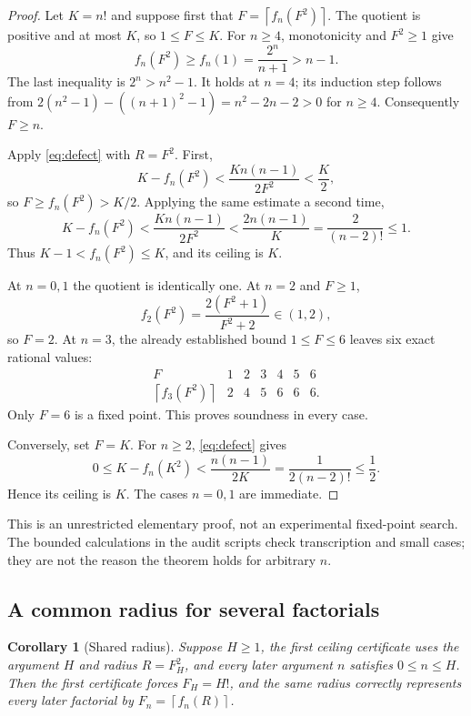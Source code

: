 \documentclass[11pt,letterpaper]{article}
\newtheorem{corollary}[theorem]{Corollary}
\theoremstyle{definition}
\theoremstyle{remark}
\newcommand{\ceil}[1]{\left\lceil#1\right\rceil}
\begin{document}
\begin{proof}
Let $K=n!$ and suppose first that $F=\ceil{f_n(F^2)}$.
The quotient is positive and at most $K$, so $1\le F\le K$.
For $n\ge4$, monotonicity and $F^2\ge1$ give
\[
 f_n(F^2)\ge f_n(1)=\frac{2^n}{n+1}>n-1.
\]
The last inequality is $2^n>n^2-1$. It holds at $n=4$; its induction
step follows from
$2(n^2-1)-((n+1)^2-1)=n^2-2n-2>0$ for $n\ge4$.
Consequently $F\ge n$.

Apply \eqref{eq:defect} with $R=F^2$. First,
\[
 K-f_n(F^2)<\frac{K n(n-1)}{2F^2}<\frac K2,
\]
so $F\ge f_n(F^2)>K/2$. Applying the same estimate a second time,
\[
 K-f_n(F^2)
 <\frac{K n(n-1)}{2F^2}
 <\frac{2n(n-1)}K
 =\frac{2}{(n-2)!}\le1.
\]
Thus $K-1<f_n(F^2)\le K$, and its ceiling is $K$.

At $n=0,1$ the quotient is identically one. At $n=2$ and $F\ge1$,
\[
 f_2(F^2)=\frac{2(F^2+1)}{F^2+2}\in(1,2),
\]
so $F=2$. At $n=3$, the already established bound $1\le F\le6$
leaves six exact rational values:
\[
\begin{array}{c|rrrrrr}
 F&1&2&3&4&5&6\\\hline
 \ceil{f_3(F^2)}&2&4&5&6&6&6.
\end{array}
\]
Only $F=6$ is a fixed point. This proves soundness in every case.

Conversely, set $F=K$. For $n\ge2$, \eqref{eq:defect} gives
\[
 0\le K-f_n(K^2)<\frac{n(n-1)}{2K}
                  =\frac{1}{2(n-2)!}\le\frac12.
\]
Hence its ceiling is $K$. The cases $n=0,1$ are immediate.
\end{proof}

This is an unrestricted elementary proof, not an experimental fixed-point
search. The bounded calculations in the audit scripts check transcription
and small cases; they are not the reason the theorem holds for arbitrary
$n$.

\subsection{A common radius for several factorials}

\begin{corollary}[Shared radius]\label{cor:common-radius}
Suppose $H\ge1$, the first ceiling certificate uses the argument $H$
and radius $R=F_H^2$, and every later argument $n$ satisfies $0\le n\le H$.
Then the first certificate forces $F_H=H!$, and the same radius correctly
represents every later factorial by $F_n=\ceil{f_n(R)}$.
\end{corollary}
\end{document}
